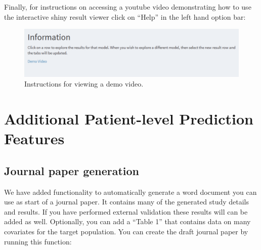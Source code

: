 \documentclass[11pt]{book}
\begin{document}
Finally, for instructions on accessing a youtube video demonstrating how
to use the interactive shiny result viewer click on ``Help'' in the left
hand option bar:

\begin{figure}

{\centering \includegraphics[width=0.8\linewidth]{images/PatientLevelPrediction/shiny/shinyHelp} 

}

\caption{Instructions for viewing a demo video.}\label{fig:shinyHelp}
\end{figure}

\newpage

\section{Additional Patient-level Prediction
Features}\label{additional-patient-level-prediction-features}

\subsection{Journal paper generation}\label{journal-paper-generation}

We have added functionality to automatically generate a word document
you can use as start of a journal paper. It contains many of the
generated study details and results. If you have performed external
validation these results will can be added as well. Optionally, you can
add a ``Table 1'' that contains data on many covariates for the target
population. You can create the draft journal paper by running this
function:
\end{document}
